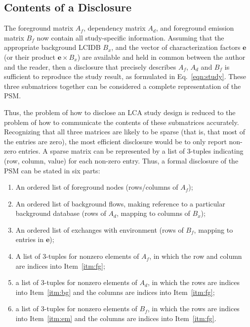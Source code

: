 \subsection{Contents of a Disclosure}

The foreground matrix $A_f$, dependency matrix $A_d$, and foreground emission matrix $B_f$ now contain all study-specific information.  Assuming that the appropriate background LCIDB $B_x$, and the vector of characterization factors $\mathbf{e}$ (or their product $\mathbf{e}\times B_x$) are available and held in common between the author and the reader, then a disclosure that precisely describes $A_f$, $A_d$ and $B_f$ is sufficient to reproduce the study result, as formulated in Eq.~\ref{eqn:study}.  These three submatrices together can be considered a complete representation of the PSM.

Thus, the problem of how to disclose an LCA study design is reduced to the problem of how to communicate the contents of these submatrices accurately.  Recognizing that all three matrices are likely to be sparse (that is, that most of the entries are zero), the most efficient disclosure would be to only report non-zero entries.  A sparse matrix can be represented by a list of 3-tuples indicating (row, column, value) for each non-zero entry.  Thus, a formal disclosure of the PSM can be stated in six parts:
\begin{enumerate}[label={\em d-\roman*}., ref={\em d-\roman*}]
\item\label{itm:fg} An ordered list of foreground nodes (rows/columns of $A_f$);
\item\label{itm:bg} An ordered list of background flows, making reference to a particular background database (rows of $A_d$, mapping to columns of $B_x$);
\item\label{itm:em} An ordered list of exchanges with environment (rows of $B_f$, mapping to entries in $\mathbf{e}$);
\item\label{itm:af} A list of 3-tuples for nonzero elements of $A_f$, in which the row and column are indices into Item~\ref{itm:fg};
\item\label{itm:ad} a list of 3-tuples for nonzero elements of $A_d$, in which the rows are indices into Item~\ref{itm:bg} and the columns are indices into Item~\ref{itm:fg};
\item\label{itm:bf} a list of 3-tuples for nonzero elements of $B_f$, in which the rows are indices into Item~\ref{itm:em} and the columns are indices into Item~\ref{itm:fg}.
\end{enumerate}

